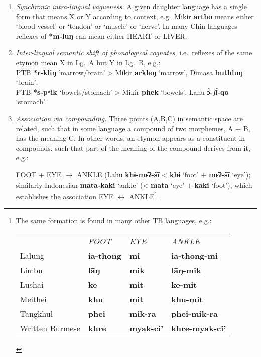 \begin{enumerate}
\item
\textit{Synchronic intra-lingual vagueness.} A given daughter language has a single
form that means X or Y according to context, e.g.\ 
Mikir \textbf{artho} means either ‘blood vessel’ or ‘tendon’ or ‘muscle’ or ‘nerve’.
In many Chin languages reflexes of \textbf{*m‑luŋ} can mean either HEART or LIVER.
\item
\textit{Inter-lingual semantic shift of phonological cognates,} i.e.\ reflexes of the
same etymon mean X in Lg.~A but Y in Lg.~B, e.g.:\\
\hspace*{2ex}PTB \textbf{*r-kliŋ} ‘marrow/brain’ > Mikir \textbf{arkleŋ} ‘marrow’, Dimasa \textbf{buthluŋ} ‘brain’;\\
\hspace*{2ex}PTB \textbf{*s-pʷik} ‘bowels/stomach’ > Mikir \textbf{phek} ‘bowels’, Lahu \textbf{ɔ̀-\textit{fɨ́}-qō} ‘stomach’.
\item
\textit{Association via compounding.}  Three points (A,B,C) in semantic space are
related, such that in some language a compound of two morphemes, A + B, has the
meaning C.  In other words, an etymon appears as a constituent in compounds,
such that part of the meaning of the compound derives from it, e.g.:

FOOT + EYE $\to$ ANKLE (Lahu \textbf{khɨ-mɛ̂ʔ-šī} < \textbf{khɨ} ‘foot’ + \textbf{mɛ̂ʔ-šī} ‘eye’);
similarly Indonesian \textbf{mata-kaki} ‘ankle’ (< \textbf{mata} ‘eye’ + \textbf{kaki} ‘foot’), which
establishes the association EYE $\longleftrightarrow$ ANKLE\footnote{The same formation is
found in many other TB languages, e.g.:

\begin{tabular}{llll}
				&\textit{FOOT}	&\textit{EYE}	&\textit{ANKLE}\\
Lalung			&\textbf{ia-thong}	&\textbf{mi}	&\textbf{ia-thong-mi}\\
Limbu			&\textbf{lāŋ}	&\textbf{mik}	&\textbf{lāŋ-mik}\\
Lushai			&\textbf{ke}		&\textbf{mit}	&\textbf{ke-mit}\\
Meithei			&\textbf{khu}	&\textbf{mit}	&\textbf{khu-mit}\\
Tangkhul		&\textbf{phei}	&\textbf{mik-ra}	&\textbf{phei-mik-ra}\\
Written Burmese	&\textbf{khre}	&\textbf{myak-ci’}	&\textbf{khre-myak-ci’}\\
\end{tabular}}
\end{enumerate}

